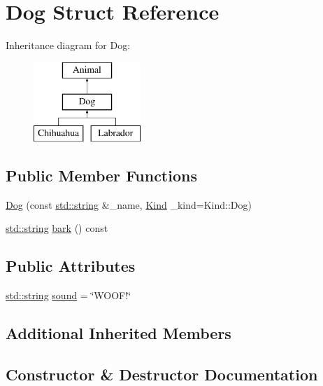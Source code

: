 \hypertarget{struct_dog}{}\section{Dog Struct Reference}
\label{struct_dog}
Inheritance diagram for Dog\+:\begin{figure}[H]
\begin{center}
\leavevmode
\includegraphics[height=3.000000cm]{struct_dog}
\end{center}
\end{figure}
\subsection*{Public Member Functions}
\begin{DoxyCompactItemize}
\item 
\mbox{\hyperlink{struct_dog_a051441f800c91f00e4a5940d1c69cc9b}{Dog}} (const \mbox{\hyperlink{_s_d_l__opengl__glext_8h_ab4ccfaa8ab0e1afaae94dc96ef52dde1}{std\+::string}} \&\+\_\+name, \mbox{\hyperlink{struct_animal_abd6bed3bf6361cc3dc37c03f297e3f48}{Kind}} \+\_\+kind=Kind\+::\+Dog)
\item 
\mbox{\hyperlink{_s_d_l__opengl__glext_8h_ab4ccfaa8ab0e1afaae94dc96ef52dde1}{std\+::string}} \mbox{\hyperlink{struct_dog_ae958f57f90e9c9b7d17a184e27ef0b5c}{bark}} () const
\end{DoxyCompactItemize}
\subsection*{Public Attributes}
\begin{DoxyCompactItemize}
\item 
\mbox{\hyperlink{_s_d_l__opengl__glext_8h_ab4ccfaa8ab0e1afaae94dc96ef52dde1}{std\+::string}} \mbox{\hyperlink{struct_dog_a7fa040f0b70c21193ac4386f393df5b6}{sound}} = \char`\"{}W\+O\+O\+F!\char`\"{}
\end{DoxyCompactItemize}
\subsection*{Additional Inherited Members}


\subsection{Constructor \& Destructor Documentation}
\mbox{\label{struct_dog_a051441f800c91f00e4a5940d1c69cc9b}} 
